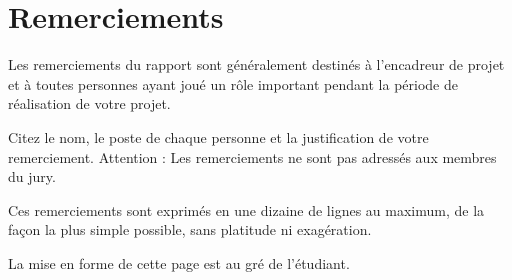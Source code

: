 \chapter*{Remerciements}
Les remerciements du rapport sont généralement destinés à l’encadreur de projet et à toutes personnes ayant joué un rôle important pendant la période de réalisation de votre projet. \par 
Citez le nom, le poste de chaque personne et la justification de votre remerciement.
Attention : Les remerciements ne sont pas adressés aux membres du jury.\par
Ces remerciements sont exprimés en une dizaine de lignes au maximum, de la façon la plus simple possible, sans platitude ni exagération.\par
La mise en forme de cette page est au gré de l’étudiant.